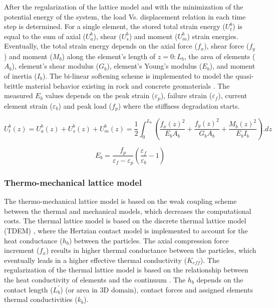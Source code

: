 After the regularization of the lattice model and with the minimization of the potential energy of the system, the load Vs. displacement relation in each time step is determined. For a single element, the stored total strain energy ($U_t^b$) is equal to the sum of axial ($U_a^b$), shear ($U_s^b$) and moment ($U_m^b$) strain energies. Eventually, the total strain energy depends on the axial force ($f_x$), shear force ($f_y$) and moment ($M_b$) along the element's length of $z=0:L_b$, the area of elements ($A_b$), element's shear modulus ($G_b$), element's Young's modulus ($E_b$), and moment of inertia ($I_b$). The bi-linear softening scheme is implemented to model the quasi-brittle material behavior existing in rock and concrete geomaterials \cite{Inceetal2003}. The measured $E_b$ values depends on the peak strain ($\varepsilon_p$), failure  strain ($\varepsilon_f$), current element strain ($\varepsilon_b$) and peak load ($f_p$) where the stiffness degradation starts.

\begin{equation}
\label{eq:LEM_Mechanical_8}
 U_t^b(z)=U_a^b(z)+U_s^b(z)+U_m^b(z)=\frac{1}{2}\int_{0}^{L_b}{\left(\frac{f_x{(z)}^2}{E_b A_b}+\frac{f_y{(z)}^2}{G_b A_b}+\frac{M_b{(z)}^2}{E_b I_b}\right).dz} 
\end{equation}

\begin{equation}
\label{eq:LEM_Mechanical_9}
E_b=\frac{f_p}{\varepsilon_f-\varepsilon_p}\left(\frac{\varepsilon_f}{\varepsilon_b}-1\right)
\end{equation}

\subsubsection*{Thermo-mechanical lattice model}
\label{Section:ThermalLattice}

The thermo-mechanical lattice model is based on the weak coupling scheme between the thermal and mechanical models, which decreases the computational costs. The thermal lattice model is based on the discrete thermal lattice model (TDEM) \cite{Zhangetal2011, Fengetal2008}, where the Hertzian contact model is implemented to account for the heat conductance ($h_b$) between the particles. The axial compression force increment ($f_x$) results in higher thermal conductance between the particles, which eventually leads in a higher effective thermal conductivity ($K_{eff}$). The regularization of the thermal lattice model is based on the relationship between the heat conductivity of elements and the continuum \cite{Rizvietal2018b}. The $h_b$ depends on the contact length ($L_b^\prime$) (or area in 3D domain), contact forces and assigned elements thermal conductivities ($k_{b}$).

